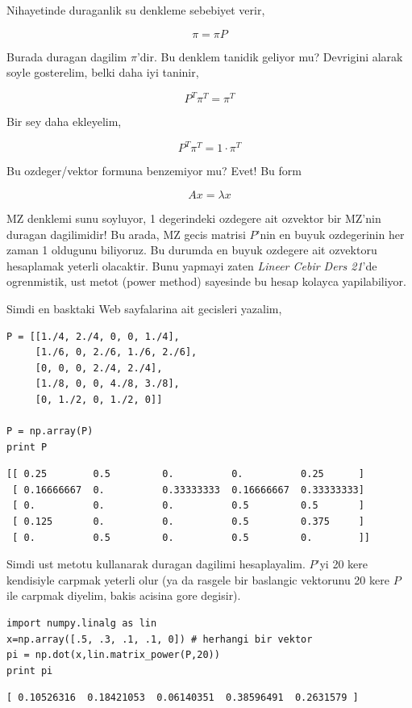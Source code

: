 \documentclass[12pt,fleqn]{article}\usepackage{../common}
\begin{document}
Nihayetinde duraganlik su denkleme sebebiyet verir, 

$$ \pi = \pi P $$

Burada duragan dagilim $\pi$'dir. Bu denklem tanidik geliyor mu?  Devrigini
alarak soyle gosterelim, belki daha iyi taninir, 

$$ P^T\pi^T = \pi^T $$

Bir sey daha ekleyelim, 

$$ P^T\pi^T = 1 \cdot \pi^T $$

Bu ozdeger/vektor formuna benzemiyor mu? Evet! Bu form 

$$ Ax = \lambda x $$

MZ denklemi sunu soyluyor, 1 degerindeki ozdegere ait ozvektor bir MZ'nin
duragan dagilimidir! Bu arada, MZ gecis matrisi $P$'nin en buyuk
ozdegerinin her zaman 1 oldugunu biliyoruz. Bu durumda en buyuk ozdegere
ait ozvektoru hesaplamak yeterli olacaktir. Bunu yapmayi zaten {\em Lineer
  Cebir Ders 21}'de ogrenmistik, ust metot (power method) sayesinde bu
hesap kolayca yapilabiliyor.

Simdi en basktaki Web sayfalarina ait gecisleri yazalim,

\begin{verbatim}
P = [[1./4, 2./4, 0, 0, 1./4],
     [1./6, 0, 2./6, 1./6, 2./6],
     [0, 0, 0, 2./4, 2./4],
     [1./8, 0, 0, 4./8, 3./8],
     [0, 1./2, 0, 1./2, 0]]

P = np.array(P)
print P
\end{verbatim}

\begin{verbatim}
[[ 0.25        0.5         0.          0.          0.25      ]
 [ 0.16666667  0.          0.33333333  0.16666667  0.33333333]
 [ 0.          0.          0.          0.5         0.5       ]
 [ 0.125       0.          0.          0.5         0.375     ]
 [ 0.          0.5         0.          0.5         0.        ]]
\end{verbatim}

Simdi ust metotu kullanarak duragan dagilimi hesaplayalim. $P$'yi 20 kere
kendisiyle carpmak yeterli olur (ya da rasgele bir baslangic vektorunu 20
kere $P$ ile carpmak diyelim, bakis acisina gore degisir). 

\begin{verbatim}
import numpy.linalg as lin
x=np.array([.5, .3, .1, .1, 0]) # herhangi bir vektor
pi = np.dot(x,lin.matrix_power(P,20))
print pi
\end{verbatim}

\begin{verbatim}
[ 0.10526316  0.18421053  0.06140351  0.38596491  0.2631579 ]
\end{verbatim}
\end{document}
